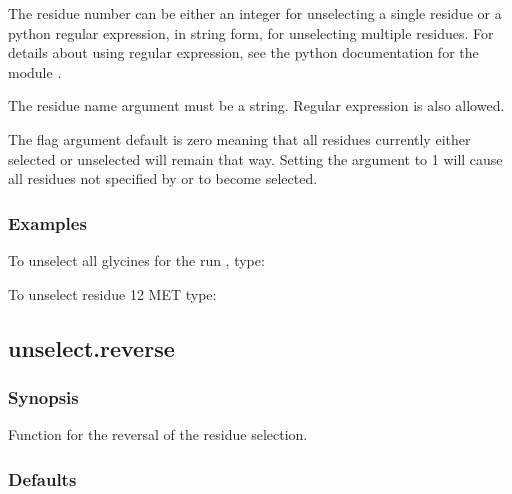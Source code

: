 The residue number can be either an integer for unselecting a single residue or a python 
regular expression,  in string form, for unselecting multiple residues.  For details about
using regular expression,  see the python  documentation for the module 
.

The residue name argument must be a string.  Regular expression  is also allowed.

The 
 flag argument default is zero meaning that all residues currently either
selected or unselected will remain that way.  Setting the argument to 1 will cause all
residues not specified by 
 or 
 to become selected.


\subsubsection{Examples}

To unselect all glycines for the run 
, type:




To unselect residue 12 MET type:








\newpage

\subsection{unselect.reverse}


\subsubsection{Synopsis}

Function for the reversal of the residue selection.

\subsubsection{Defaults}

